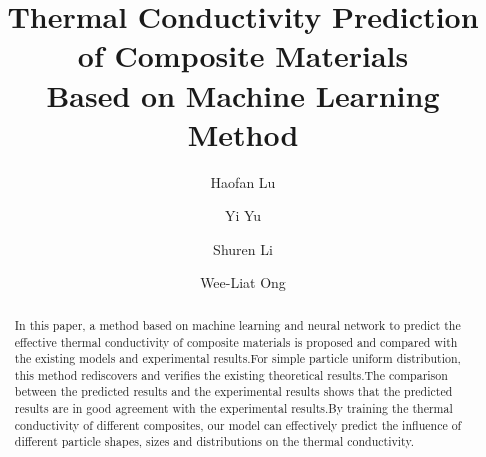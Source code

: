 \documentclass[conference,compsoc]{IEEEtran}
\begin{document}
%
\title{Thermal Conductivity Prediction of Composite Materials \\ Based on Machine Learning Method}



\author{Haofan Lu \and Yi Yu \and Shuren Li \and Wee-Liat Ong}

\maketitle

\begin{abstract}
In this paper, a method based on machine learning and neural network to predict the effective thermal conductivity of composite materials is proposed and compared with the existing models and experimental results.For simple particle uniform distribution, this method rediscovers and verifies the existing theoretical results.The comparison between the predicted results and the experimental results shows that the predicted results are in good agreement with the experimental results.By training the thermal conductivity of different composites, our model can effectively predict the influence of different particle shapes, sizes and distributions on the thermal conductivity.
\end{abstract}
\end{document}
